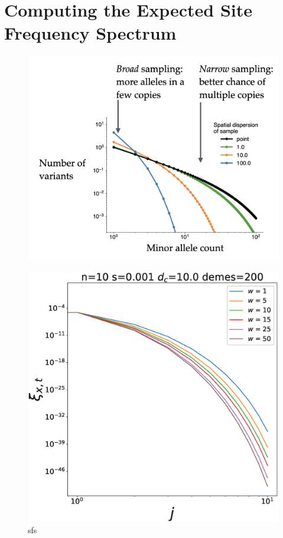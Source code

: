 \section{Computing the Expected Site Frequency Spectrum}

\begin{figure}[h]
    \centering
    \includegraphics[scale=0.3]{img/sampling_curves.png}
    \caption{}
    \label{fig:}
\end{figure}

\begin{figure}[h]
    \centering
    \includegraphics[scale=0.3]{img/fig4.eps}
    \caption{sfs}
    \label{fig:}
\end{figure}


